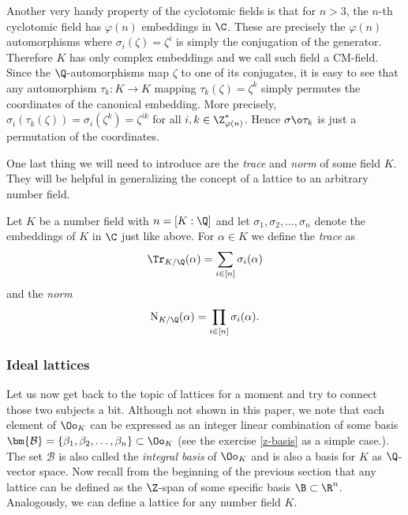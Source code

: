 Another very handy property of the cyclotomic fields is that for $n > 3$, the $n$-th cyclotomic field has $\varphi(n)$ embeddings in $\C$. These are precisely the $\varphi(n)$ automorphisms where $\sigma_i(\zeta) = \zeta^i$ is simply the conjugation of the generator. Therefore $K$ has only complex embeddings and we call such field a CM-field. Since the $\Q$-automorphisms map $\zeta$ to one of its conjugates, it is easy to see that any automorphism $\tau_k : K \rightarrow K$ mapping $\tau_k(\zeta) = \zeta^k$ simply permutes the coordinates of the canonical embedding. More precisely, $\sigma_i(\tau_k(\zeta)) = \sigma_i(\zeta^k) = \zeta^{ik}$ for all $i,k \in \Z_{\varphi(n)}^*$. Hence $\sigma \o \tau_k$ is just a permutation of the coordinates.

One last thing we will need to introduce are the \textit{trace} and \textit{norm} of some field $K$. They will be helpful in generalizing the concept of a lattice to an arbitrary number field.

\begin{definition}
	Let $K$ be a number field with $n = [K:\Q]$ and let $\sigma_1, \sigma_2, \ldots, \sigma_n$ denote the embeddings of $K$ in $\C$ just like above. For $\alpha \in K$ we define the \textit{trace} as
	\[ \Tr_{K/\Q}(\alpha) = \sum_{i \in [n]} \sigma_i(\alpha) \]
	and the \textit{norm}
	\[ \text{N}_{K/\Q}(\alpha) = \prod_{i \in [n]} \sigma_i(\alpha). \]
\end{definition}

\subsubsection*{Ideal lattices}
Let us now get back to the topic of lattices for a moment and try to connect those two subjects a bit. Although not shown in this paper, we note that each element of $\Oo_K$ can be expressed as an integer linear combination of some basis $\bm{\mathcal{B}} = \{\beta_1, \beta_2, \ldots, \beta_n \} \subset \Oo_K$ (see the exercise \ref{z-basis} as a simple case.). The set $\bm{\mathcal{B}}$ is also called the \textit{integral basis} of $\Oo_K$ and is also a basis for $K$ as $\Q$-vector space. Now recall from the beginning of the previous section that any lattice can be defined as the $\Z$-span of some specific basis $\B \subset \R^n$. Analogously, we can define a lattice for any number field $K$.
